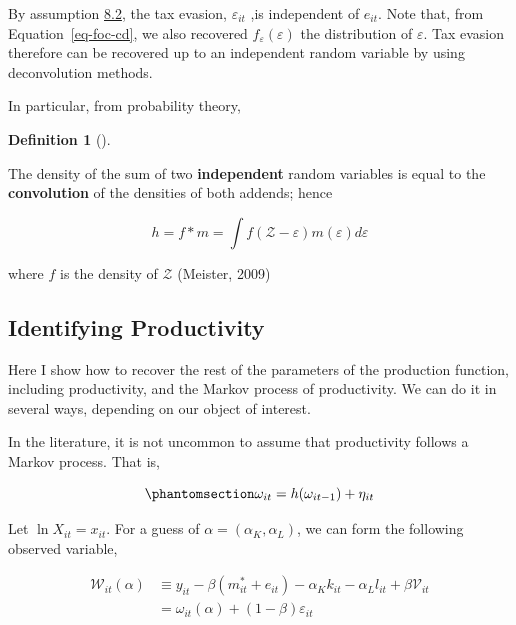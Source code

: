 \documentclass[
  12pt]{article}
\theoremstyle{definition}
\newtheorem{definition}{Definition}[section]
\theoremstyle{remark}
\newenvironment{fbx}[3]{\begin{tcolorbox}[enhanced, breakable,%
attach boxed title to top*={xshift=1.4pt},
boxed title style={boxrule=0.0mm, fuzzy shadow={1pt}{-1pt}{0mm}{0.1mm}{gray}, arc=.3em, rounded corners=east, sharp corners=west}, colframe=#1-color2, colbacktitle=#1-color1, colback = white, coltitle=black,  titlerule=0mm, toprule=0pt, bottomrule=.7pt, leftrule=.3em, rightrule=0pt, outer arc=.3em,  arc=0pt,	 sharp corners = east, left=.5em, bottomtitle=1mm, toptitle=1mm,title=\textbf{#2}\hspace{0.5em}{#3}]}
{\end{tcolorbox}}
\begin{document}
By assumption \hyperref[ass-ind]{8.2}, the tax evasion,
\(\varepsilon_{it}\) ,is independent of \(e_{it}\). Note that, from
Equation~\ref{eq-foc-cd}, we also recovered
\(f_{\varepsilon}(\varepsilon)\) the distribution of \(\varepsilon\).
Tax evasion therefore can be recovered up to an independent random
variable by using deconvolution methods.

In particular, from probability theory,

\begin{definition}[]\protect\hypertarget{def-conv}{}\label{def-conv}

\begin{fbx}{Definition}{Definition: }{Convolution}
\label{}
The density of the sum of two \textbf{independent} random variables is
equal to the \textbf{convolution} of the densities of both addends;
hence

\[
h = f*m = \int f(\mathcal Z - \varepsilon)m(\varepsilon)d\varepsilon
\]

where \(f\) is the density of \(\mathcal Z\) (Meister, 2009)

\end{fbx}

\end{definition}

\subsection{Identifying Productivity}\label{identifying-productivity}

Here I show how to recover the rest of the parameters of the production
function, including productivity, and the Markov process of
productivity. We can do it in several ways, depending on our object of
interest.

In the literature, it is not uncommon to assume that productivity
follows a Markov process. That is,

\begin{equation}\phantomsection\label{eq-prod-markov}{
    \omega_{it}=h(\omega_{it-1})+\eta_{it}
}\end{equation}

Let \(\ln X_{it}=x_{it}\). For a guess of
\(\alpha=(\alpha_K,\alpha_L)\), we can form the following observed
variable,

\[
\begin{aligned}
    \mathcal W_{it}(\alpha) & \equiv y_{it} - \beta (m^*_{it}+e_{it})-\alpha_K k_{it}-\alpha_L l_{it}+\beta\mathcal{V}_{it}\\
    & = \omega_{it}(\alpha)+(1-\beta)\varepsilon_{it}
\end{aligned}
\]
\end{document}
